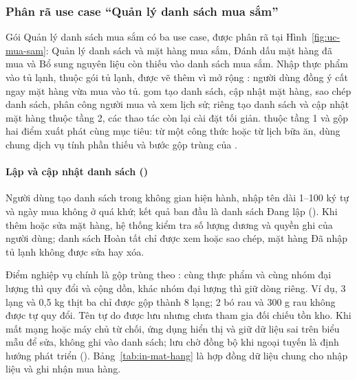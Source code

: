 \subsubsection{Phân rã use case “Quản lý danh sách mua sắm”}\label{sssec:pr-mua-sam}

Gói Quản lý danh sách mua sắm có ba use case, được phân rã tại Hình~\ref{fig:uc-mua-sam}:  Quản lý danh sách và mặt hàng mua sắm,  Đánh dấu mặt hàng đã mua và  Bổ sung nguyên liệu còn thiếu vào danh sách mua sắm.  Nhập thực phẩm vào tủ lạnh, thuộc gói tủ lạnh, được vẽ thêm vì mở rộng : người dùng đồng ý cất ngay mặt hàng vừa mua vào tủ.  gom tạo danh sách, cập nhật mặt hàng, sao chép danh sách, phân công người mua và xem lịch sử; riêng tạo danh sách và cập nhật mặt hàng thuộc tầng 2, các thao tác còn lại cài đặt tối giản.  thuộc tầng 1 và gộp hai điểm xuất phát cùng mục tiêu: từ một công thức hoặc từ lịch bữa ăn, dùng chung dịch vụ tính phần thiếu và bước gộp trùng của .



\paragraph*{Lập và cập nhật danh sách ()}
Người dùng tạo danh sách trong không gian hiện hành, nhập tên dài 1--100 ký tự và ngày mua không ở quá khứ; kết quả ban đầu là danh sách Đang lập (). Khi thêm hoặc sửa mặt hàng, hệ thống kiểm tra số lượng dương và quyền ghi của người dùng; danh sách Hoàn tất chỉ được xem hoặc sao chép, mặt hàng Đã nhập tủ lạnh không được sửa hay xóa.

Điểm nghiệp vụ chính là gộp trùng theo : cùng thực phẩm và cùng nhóm đại lượng thì quy đổi và cộng dồn, khác nhóm đại lượng thì giữ dòng riêng. Ví dụ, 3 lạng và 0,5 kg thịt ba chỉ được gộp thành 8 lạng; 2 bó rau và 300 g rau không được tự quy đổi. Tên tự do được lưu nhưng chưa tham gia đối chiếu tồn kho. Khi mất mạng hoặc máy chủ từ chối, ứng dụng hiển thị  và giữ dữ liệu sai trên biểu mẫu để sửa, không ghi vào danh sách; lưu chờ đồng bộ khi ngoại tuyến là định hướng phát triển (). Bảng~\ref{tab:in-mat-hang} là hợp đồng dữ liệu chung cho nhập liệu và ghi nhận mua hàng.


